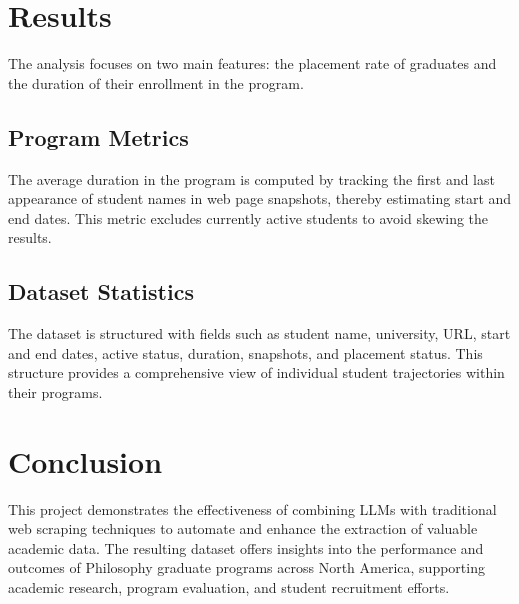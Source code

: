 \documentclass[11pt]{article}
\begin{document}
\section{Results}

    The analysis focuses on two main features: the placement rate of graduates and the duration of their enrollment in the program.

\subsection{Program Metrics}

    The average duration in the program is computed by tracking the first and last appearance of student names in web page snapshots, thereby estimating start and end dates. This metric excludes currently active students to avoid skewing the results.

\subsection{Dataset Statistics}

    The dataset is structured with fields such as student name, university, URL, start and end dates, active status, duration, snapshots, and placement status.
    This structure provides a comprehensive view of individual student trajectories within their programs.

\section{Conclusion}

    This project demonstrates the effectiveness of combining LLMs with traditional web scraping techniques to automate and enhance the extraction of valuable academic data.
    The resulting dataset offers insights into the performance and outcomes of Philosophy graduate programs across North America, supporting academic research, program evaluation, and student recruitment efforts.
\end{document}

